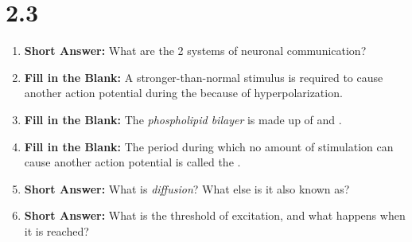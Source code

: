 \section*{2.3}
\begin{enumerate}[label=\textbf{Q2.3.\arabic*}]


      \item \textbf{Short Answer:} What are the 2 systems of neuronal communication? \\

      \item \textbf{Fill in the Blank:} A stronger-than-normal stimulus is required to cause another action potential during the \underline{\hspace{3cm}} because of hyperpolarization. \\

      \item \textbf{Fill in the Blank:} The \textit{phospholipid bilayer} is made up of \underline{\hspace{3cm}} and \underline{\hspace{3cm}}. \\

      \item \textbf{Fill in the Blank:} The period during which no amount of stimulation can cause another action potential is called the \underline{\hspace{3cm}}. \\

      \item \textbf{Short Answer:} What is \textit{diffusion}? What else is it also known as? \\

      \item \textbf{Short Answer:} What is the threshold of excitation, and what happens when it is reached? \\

\newpage


\end{enumerate}
